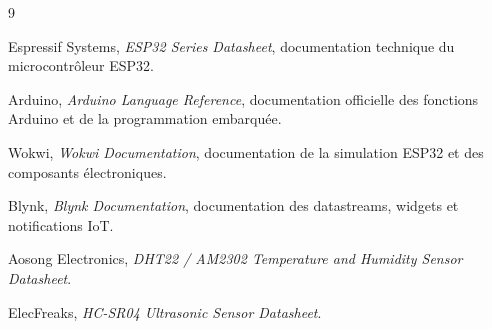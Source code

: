\documentclass[12pt,a4paper]{report}
\begin{document}
\begin{thebibliography}{9}
Espressif Systems, \textit{ESP32 Series Datasheet}, documentation technique du microcontrôleur ESP32.

Arduino, \textit{Arduino Language Reference}, documentation officielle des fonctions Arduino et de la programmation embarquée.

Wokwi, \textit{Wokwi Documentation}, documentation de la simulation ESP32 et des composants électroniques.

Blynk, \textit{Blynk Documentation}, documentation des datastreams, widgets et notifications IoT.

Aosong Electronics, \textit{DHT22 / AM2302 Temperature and Humidity Sensor Datasheet}.

ElecFreaks, \textit{HC-SR04 Ultrasonic Sensor Datasheet}.
\end{thebibliography}
\end{document}
